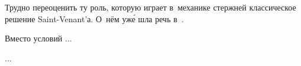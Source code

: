 
\begin{otherlanguage}{russian}

Трудно переоценить ту роль, которую играет в~механике стержней классическое решение Saint\hbox{-\hspace{-0.2ex}}Venant’а. О~нём уж\'{е} шла речь в~.

Вместо условий ...

...



\end{otherlanguage}



